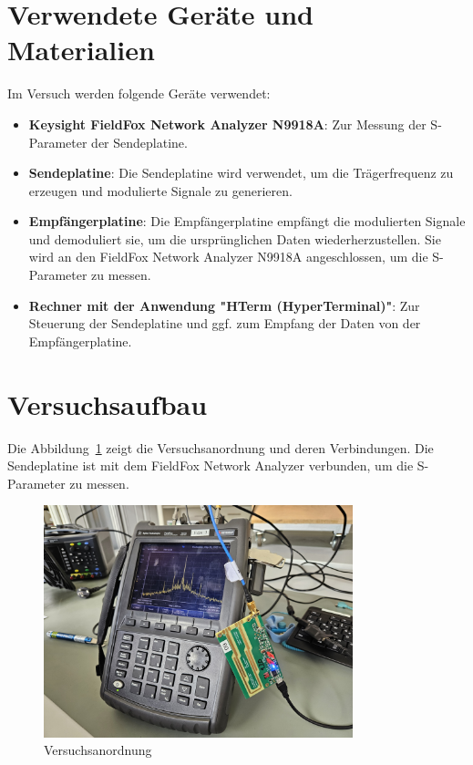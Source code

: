 \section{Verwendete Geräte und Materialien}
Im Versuch werden folgende Geräte verwendet:
\begin{itemize}
    \item \textbf{Keysight FieldFox Network Analyzer N9918A}: Zur Messung der S-Parameter der Sendeplatine.
    \item \textbf{Sendeplatine}: Die Sendeplatine wird verwendet, um die Trägerfrequenz zu erzeugen und modulierte Signale zu generieren.
    \item \textbf{Empfängerplatine}: Die Empfängerplatine empfängt die modulierten Signale und demoduliert sie, um die ursprünglichen Daten wiederherzustellen. Sie wird an den FieldFox Network Analyzer N9918A angeschlossen, um die S-Parameter zu messen.
    \item \textbf{Rechner mit der Anwendung "HTerm (HyperTerminal)"}: Zur Steuerung der Sendeplatine und ggf. zum Empfang der Daten von der Empfängerplatine.
\end{itemize}
\clearpage
\section{Versuchsaufbau}
Die Abbildung~\ref{fig:Versuchsanordnung} zeigt die Versuchsanordnung und deren Verbindungen. Die Sendeplatine ist mit dem FieldFox Network Analyzer verbunden, um die S-Parameter zu messen.
\begin{figure}[H]
    \centering
    \includegraphics[width=0.8\textwidth]{Pictures/Versuchsanordnung.jpg}
    \caption{Versuchsanordnung}
    \label{fig:Versuchsanordnung}
\end{figure}
\clearpage
